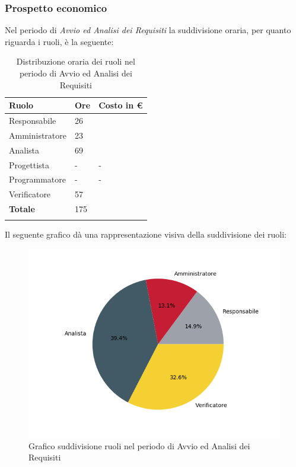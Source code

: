\subsubsection{Prospetto economico}
Nel periodo di \textit{Avvio ed Analisi dei Requisiti} la suddivisione oraria, per quanto riguarda i ruoli, è la seguente: 

\begin{longtable}{| C{.30\textwidth}| C{.15\textwidth}| C{.20\textwidth}|}
\hline
\textbf{Ruolo} & \textbf{Ore} & \textbf{Costo in \euro} \\
\hline
Responsabile & 26 &  \\
\hline
Amministratore & 23 &  \\
\hline
Analista & 69 &  \\
\hline
Progettista & - & - \\
\hline
Programmatore & - & - \\
\hline
Verificatore & 57 & \\
\hline
\textbf{Totale} & 175 &  \\
\hline

\caption{Distribuzione oraria dei ruoli nel periodo di Avvio ed Analisi dei Requisiti}
\label{tab: distribuzione oraria aar}
\end{longtable}

Il seguente grafico dà una rappresentazione visiva della suddivisione dei ruoli:
\begin{figure}[H]
	\centering
  		\includegraphics[width=1\linewidth]{./images/torta_aar.png}
  		\caption{Grafico suddivisione ruoli nel periodo di Avvio ed Analisi dei Requisiti}
  		\label{fig:grafico suddivione ruoli periodo di Avvio ed analisi dei requisiti}
\end{figure}

